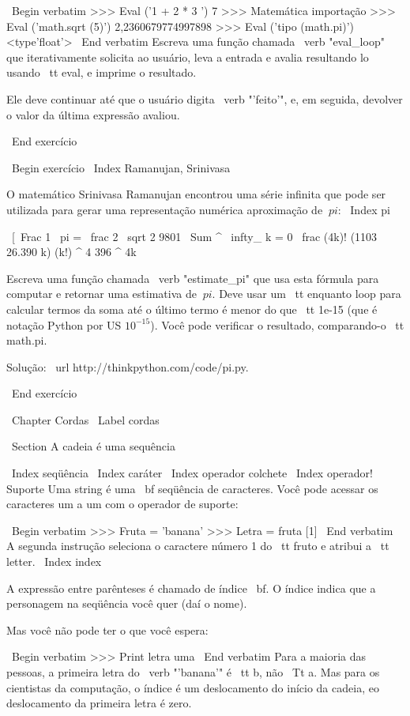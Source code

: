 \documentclass[10pt]{book}
\begin{document}
{{{{\ Begin {verbatim}
>>> Eval ('1 + 2 * 3 ')
7
>>> Matemática importação
>>> Eval ('math.sqrt (5)')
2,2360679774997898
>>> Eval ('tipo (math.pi)')
<type'float'>
\ End {verbatim}
%
Escreva uma função chamada \ verb "eval_loop" que iterativamente
solicita ao usuário, leva a entrada e avalia resultando
lo usando {\ tt eval}, e imprime o resultado.

Ele deve continuar até que o usuário digita \ verb "'feito'", e, em seguida,
devolver o valor da última expressão avaliou.

\ End {} exercício


\ Begin {} exercício
\ Index {Ramanujan, Srinivasa}

O matemático Srinivasa Ramanujan encontrou uma
série infinita
que pode ser utilizada para gerar uma representação numérica
aproximação de $ \ pi $:
\ Index {pi}

\ [\ Frac {1} {\ pi} = \ frac {2 \ sqrt {2}} {9801} 
\ Sum ^ \ infty_ {k = 0} \ frac {(4k)! (1103 26.390 k)} {(k!) ^ 4 396 ^ {4k}} \]

Escreva uma função chamada \ verb "estimate_pi" que usa esta fórmula
para computar e retornar uma estimativa de $ \ pi $. Deve usar um {\ tt enquanto}
loop para calcular termos da soma até o último termo é
menor do que {\ tt 1e-15} (que é notação Python por US $ 10 ^ {-15} $).
Você pode verificar o resultado, comparando-o {\ tt math.pi}.

Solução: \ url {http://thinkpython.com/code/pi.py}.

\ End {} exercício


\ Chapter {} Cordas
\ Label {} cordas


\ Section {A cadeia é uma sequência}

\ Index {seqüência}
\ Index {caráter}
\ Index {operador colchete}
\ Index {operador! Suporte}
Uma string é uma {\ bf seqüência de caracteres}.  
Você pode acessar os caracteres um a um com o
operador de suporte:

\ Begin {verbatim}
>>> Fruta = 'banana'
>>> Letra = fruta [1]
\ End {verbatim}
%
A segunda instrução seleciona o caractere número 1 do {\ tt
fruto} e atribui a {\ tt letter}.  
\ Index {index}

A expressão entre parênteses é chamado de índice {\ bf}.  
O índice indica que a personagem na seqüência você
quer (daí o nome).

Mas você não pode ter o que você espera:

\ Begin {verbatim}
>>> Print letra
uma
\ End {verbatim}
%
Para a maioria das pessoas, a primeira letra do \ verb "'banana'" é {\ tt b}, não
{\ Tt a}. Mas para os cientistas da computação, o índice é um deslocamento do
início da cadeia, eo deslocamento da primeira letra é zero.

}}}}
\end{document}
